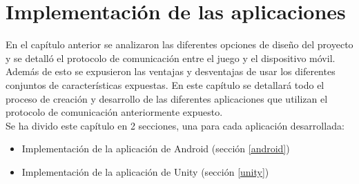 %
%
%
%
%
%
%
%
%
%

\chapter{Implementaci\'on de las aplicaciones}
\label{cap4}
\label{cap:impl}

En el cap\'itulo anterior se analizaron las diferentes opciones de dise\~no del proyecto y se detall\'o el protocolo de comunicaci\'on entre el juego y el dispositivo m\'ovil. Adem\'as de esto se expusieron las ventajas y desventajas de usar los diferentes conjuntos de caracter\'isticas expuestas. En este cap\'itulo se detallar\'a todo el proceso de creaci\'on y desarrollo de las diferentes aplicaciones que utilizan el protocolo de comunicaci\'on anteriormente expuesto.\\

Se ha divido este cap\'itulo en 2 secciones, una para cada aplicaci\'on desarrollada:\\

\begin {itemize}
\item Implementaci\'on de la aplicaci\'on de Android (secci\'on \ref{android})
\item Implementaci\'on de la aplicaci\'on de Unity (secci\'on \ref{unity})
\end {itemize}

